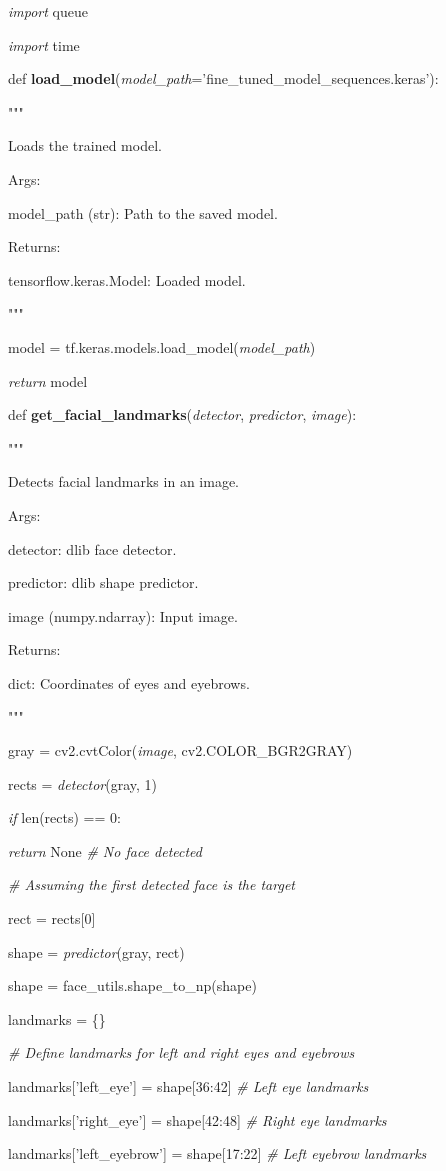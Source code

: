 \documentclass[
]{article}
\begin{document}
\emph{import} queue

\emph{import} time

def \textbf{load\_model}(\emph{model\_path}='fine\_tuned\_model\_sequences.keras'):

"""

Loads the trained model.

Args:

model\_path (str): Path to the saved model.

Returns:

tensorflow.keras.Model: Loaded model.

"""

model = tf.keras.models.load\_model(\emph{model\_path})

\emph{return} model

def \textbf{get\_facial\_landmarks}(\emph{detector}, \emph{predictor}, \emph{image}):

"""

Detects facial landmarks in an image.

Args:

detector: dlib face detector.

predictor: dlib shape predictor.

image (numpy.ndarray): Input image.

Returns:

dict: Coordinates of eyes and eyebrows.

"""

gray = cv2.cvtColor(\emph{image}, cv2.COLOR\_BGR2GRAY)

rects = \emph{detector}(gray, 1)

\emph{if} len(rects) == 0:

\emph{return} None \emph{\# No face detected}

\emph{\# Assuming the first detected face is the target}

rect = rects{[}0{]}

shape = \emph{predictor}(gray, rect)

shape = face\_utils.shape\_to\_np(shape)

landmarks = \{\}

\emph{\# Define landmarks for left and right eyes and eyebrows}

landmarks{[}'left\_eye'{]} = shape{[}36:42{]} \emph{\# Left eye landmarks}

landmarks{[}'right\_eye'{]} = shape{[}42:48{]} \emph{\# Right eye landmarks}

landmarks{[}'left\_eyebrow'{]} = shape{[}17:22{]} \emph{\# Left eyebrow landmarks}
\end{document}
